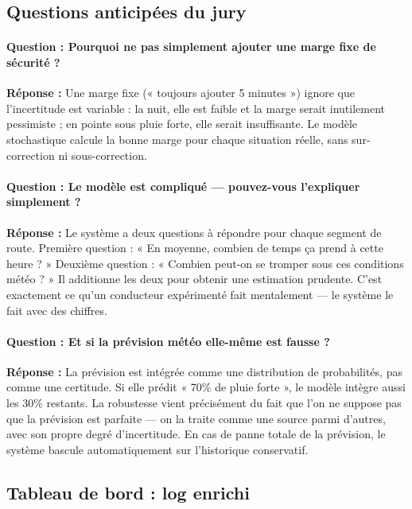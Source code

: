 \documentclass[12pt,a4paper]{article}
\theoremstyle{definition}
\theoremstyle{remark}
\begin{document}
\subsection{Questions anticipées du jury}

\paragraph{Question : \og{}Pourquoi ne pas simplement ajouter une marge
fixe de sécurité ?\fg{}}

\noindent\textbf{Réponse :} Une marge fixe (« toujours ajouter 5 minutes »)
ignore que l'incertitude est variable : la nuit, elle est faible et la
marge serait inutilement pessimiste ; en pointe sous pluie forte, elle
serait insuffisante. Le modèle stochastique calcule la bonne marge
pour chaque situation réelle, sans sur-correction ni sous-correction.

\paragraph{Question : \og{}Le modèle est compliqué — pouvez-vous l'expliquer
simplement ?\fg{}}

\noindent\textbf{Réponse :} Le système a deux questions à répondre pour
chaque segment de route. Première question : « En moyenne, combien de
temps ça prend à cette heure ? » Deuxième question : « Combien peut-on
se tromper sous ces conditions météo ? » Il additionne les deux pour
obtenir une estimation prudente. C'est exactement ce qu'un conducteur
expérimenté fait mentalement — le système le fait avec des chiffres.

\paragraph{Question : \og{}Et si la prévision météo elle-même est fausse ?\fg{}}

\noindent\textbf{Réponse :} La prévision est intégrée comme une
distribution de probabilités, pas comme une certitude. Si elle prédit
« 70\% de pluie forte », le modèle intègre aussi les 30\% restants.
La robustesse vient précisément du fait que l'on ne suppose pas que
la prévision est parfaite — on la traite comme une source parmi d'autres,
avec son propre degré d'incertitude. En cas de panne totale de la
prévision, le système bascule automatiquement sur l'historique conservatif.

\subsection{Tableau de bord : log enrichi}
\end{document}

